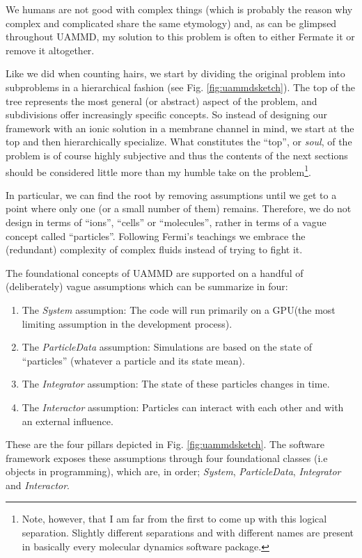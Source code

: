 \documentclass[ twoside,openright,titlepage,numbers=noenddot,%
headinclude,footinclude,cleardoublepage=empty,abstract=on,
BCOR=5mm,paper=b5,fontsize=11pt, dvipsnames
]{scrreprt}
\newcommand{\uammd}{\gls{UAMMD}\xspace}
\newcommand{\gpu}{\gls{GPU}\xspace}
\begin{document}
We humans are not good with complex things (which is probably the reason why complex and complicated share the same etymology) and, as can be glimpsed throughout \uammd, my solution to this problem is often to either Fermate it or remove it altogether.

Like we did when counting hairs, we start by dividing the original problem into subproblems in a hierarchical fashion (see Fig. \ref{fig:uammdsketch}). The top of the tree represents the most general (or abstract) aspect of the problem, and subdivisions offer increasingly specific concepts. So instead of designing our framework with an ionic solution in a membrane channel in mind, we start at the top and then hierarchically specialize. What constitutes the ``top'', or \emph{soul}, of the problem is of course highly subjective and thus the contents of the next sections should be considered little more than my humble take on the problem\footnote{Note, however, that I am far from the first to come up with this logical separation. Slightly different separations and with different names are present in basically every molecular dynamics software package.}.

In particular, we can find the root by removing assumptions until we get to a point where only one (or a small number of them) remains. Therefore, we do not design in terms of ``ions'', ``cells'' or ``molecules'', rather in terms of a vague concept called ``particles''.
Following Fermi's teachings we embrace the (redundant) complexity of complex fluids instead of trying to fight it.


The foundational concepts of \uammd are supported on a handful of (deliberately) vague assumptions which can be summarize in four:
\begin{enumerate}[label=\textbf{S.\arabic*}]
\item The \emph{System} assumption: The code will run primarily on a \gpu (the most limiting assumption in the development process).
\item The \emph{ParticleData} assumption: Simulations are based on the state of ``particles'' (whatever a particle and its state mean).
\item The \emph{Integrator} assumption: The state of these particles changes in time.
\item The \emph{Interactor} assumption: Particles can interact with each other and with an external influence.
\end{enumerate}
These are the four pillars depicted in Fig. \ref{fig:uammdsketch}. The software framework exposes these assumptions through four foundational classes (i.e objects in programming), which are, in order; \emph{System}, \emph{ParticleData}, \emph{Integrator} and \emph{Interactor}.
\end{document}
